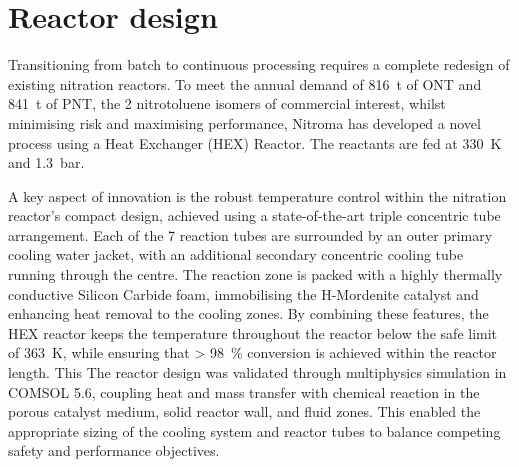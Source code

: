 \section*{Reactor design}
Transitioning from batch to continuous processing requires a complete redesign of existing nitration reactors. To meet the annual demand of \SI{816}{\tonne} of ONT and \SI{841}{\tonne} of PNT, the 2 nitrotoluene isomers of commercial interest, whilst minimising risk and maximising performance, Nitroma has developed a novel process using a Heat Exchanger (HEX) Reactor. The reactants are fed at \SI{330}{\K} and \SI{1.3}{bar}.

A key aspect of innovation is the robust temperature control within the nitration reactor's compact design, achieved using a state-of-the-art triple concentric tube arrangement. Each of the 7 reaction tubes are surrounded by an outer primary cooling water jacket, with an additional secondary concentric cooling tube running through the centre. The reaction zone is packed with a highly thermally conductive Silicon Carbide foam, immobilising the H-Mordenite catalyst and enhancing heat removal to the cooling zones. By combining these features, the HEX reactor keeps the temperature throughout the reactor below the safe limit of \SI{363}{\K}, while ensuring that \SI{> 98}{\percent} conversion is achieved within the reactor length. This  The reactor design was validated through multiphysics simulation in COMSOL 5.6, coupling heat and mass transfer with chemical reaction in the porous catalyst medium, solid reactor wall, and fluid zones. This enabled the appropriate sizing of the cooling system and reactor tubes to balance competing safety and performance objectives.

